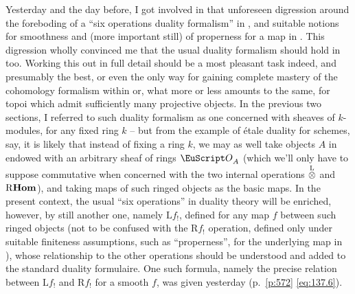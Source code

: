 \bigbreak

\noindent\hfill{}\par

\label{sec:138}%
Yesterday and the day before, I got involved in that unforeseen
digression around the foreboding of a ``six operations duality
formalism'' in \Cat, and suitable notions for smoothness and (more
important still) of properness for a map in \Cat. This digression
wholly convinced me that the usual duality formalism should hold in
\Cat{} too. Working this out in full detail should be a most pleasant
task indeed, and presumably the best, or even the only way for gaining
complete mastery of the cohomology formalism within \Cat{} or, what
more or less amounts to the same, for topoi which admit sufficiently
many projective objects. In the previous two sections, I referred to
such duality formalism as one concerned with sheaves of $k$-modules,
for any fixed ring $k$ -- but from the example of étale duality for
schemes, say, it is likely that instead of fixing a ring $k$, we may
as well take objects $A$ in \Cat{} endowed with an arbitrary sheaf of
rings $\scrO_A$ (which we'll only have to suppose commutative when
concerned with the two internal operations $\mathbin{\overset{\mathrm{L}}{\otimes}}$ and $\operatorname{R\mathbf{Hom}}$),
and taking maps of such ringed objects as the basic maps. In the
present context, the usual ``six operations'' in duality theory will
be enriched, however, by still another one, namely $\mathrm Lf_!$,
defined for any map $f$ between such ringed objects (not to be
confused with the $\mathrm Rf_!$ operation, defined only under
suitable finiteness assumptions, such as ``properness'', for the
underlying map in \Cat), whose relationship to the other operations
should be understood and added to the standard duality
formulaire. One such formula, namely the precise relation
between $\mathrm Lf_!$ and $\mathrm Rf_!$ for a smooth $f$, was given
yesterday (p.~\ref{p:572} \eqref{eq:137.6}).

